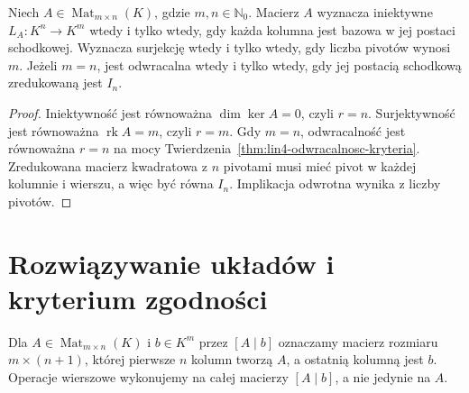 \begin{wniosek}
\label{cor:lin5-pivoty-odwracalnosc}
Niech \(A\in\operatorname{Mat}_{m\times n}(K)\),
gdzie \(m,n\in\mathbb N_0\).
Macierz \(A\) wyznacza iniektywne
\(L_A\colon K^n\to K^m\) wtedy i tylko wtedy,
gdy każda kolumna jest bazowa w jej postaci
schodkowej. Wyznacza surjekcję wtedy i tylko
wtedy, gdy liczba pivotów wynosi \(m\).
Jeżeli \(m=n\), jest odwracalna wtedy i
tylko wtedy, gdy jej postacią schodkową
zredukowaną jest \(I_n\).
\end{wniosek}
\begin{proof}
Iniektywność jest równoważna
\(\dim\ker A=0\), czyli \(r=n\).
Surjektywność jest równoważna
\(\operatorname{rk}A=m\), czyli \(r=m\).
Gdy \(m=n\), odwracalność jest
równoważna \(r=n\) na mocy
Twierdzenia~\ref{thm:lin4-odwracalnosc-kryteria}.
Zredukowana macierz kwadratowa z \(n\)
pivotami musi mieć pivot w każdej
kolumnie i wierszu, a więc być równa \(I_n\).
Implikacja odwrotna wynika z liczby pivotów.
\end{proof}

\section{Rozwiązywanie układów i kryterium zgodności}
\label{sec:lin5-uklady}

\begin{definicja}
\label{def:lin5-rozszerzona}
Dla \(A\in\operatorname{Mat}_{m\times n}(K)\)
i \(b\in K^m\) przez \([A\mid b]\)
oznaczamy macierz rozmiaru \(m\times(n+1)\),
której pierwsze \(n\) kolumn tworzą \(A\),
a ostatnią kolumną jest \(b\).
Operacje wierszowe wykonujemy na całej
macierzy \([A\mid b]\), a nie jedynie na \(A\).
\end{definicja}

